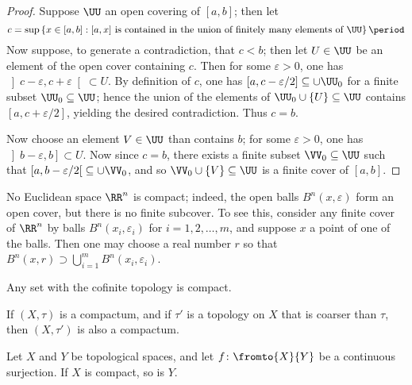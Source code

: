 \begin{proof}
	Suppose $\UU$ an open covering of $[a,b]$;
	then let
	\begin{equation*}
		c=\sup\left\{x\in[a,b] : [a,x]\text{ is contained in the union of finitely many elements of }\UU\right\} \period
	\end{equation*}
	Now suppose, to generate a contradiction, that $c<b$;
	then let $U\in\UU$ be an element of the open cover containing $c$.
	Then for some $\varepsilon>0$, one has $\left]c-\varepsilon,c+\varepsilon\right[\subset U$.
	By definition of $c$, one has $[a,c-\varepsilon/2]\subseteq\cup\UU_0$ for a finite subset $\UU_0\subseteq\UU$;
	hence the union of the elements of $\UU_0\cup\{U\}\subseteq\UU$ contains $[a,c+\varepsilon/2]$, yielding the desired contradiction.
	Thus $c=b$.

	Now choose an element $V\in\UU$ than contains $b$;
	for some $\varepsilon>0$, one has $\left]b-\varepsilon,b\right]\subset U$.
	Now since $c=b$, there exists a finite subset $\VV_0\subseteq\UU$ such that $\left[a,b-\varepsilon/2\right[\subseteq\cup\VV_0$, and so $\VV_0\cup\{V\}\subseteq\UU$ is a finite cover of $[a,b]$.
\end{proof}

\begin{exm}
	No Euclidean space $\RR^n$ is compact;%
	indeed, the open balls $B^n(x,\varepsilon)$ form an open cover, but there is no finite subcover.
	To see this, consider any finite cover of $\RR^n$ by balls $B^n(x_i,\varepsilon_i)$ for $i=1,2,\dots,m$, and suppose $x$ a point of one of the balls.
	Then one may choose a real number $r$ so that $B^n(x,r)\supset\bigcup_{i=1}^mB^n(x_i,\varepsilon_i)$.
\end{exm}

\begin{exm}
	Any set with the cofinite topology is compact.
\end{exm}

\begin{nul}
	If $(X,\tau)$ is a compactum, and if $\tau'$ is a topology on $X$ that is coarser than $\tau$, then $(X,\tau')$ is also a compactum.
\end{nul}

\begin{lem}
	Let $X$ and $Y$ be topological spaces, and
	let $f\colon\fromto{X}{Y}$ be a continuous surjection.
	If $X$ is compact, so is $Y$.
\end{lem}

